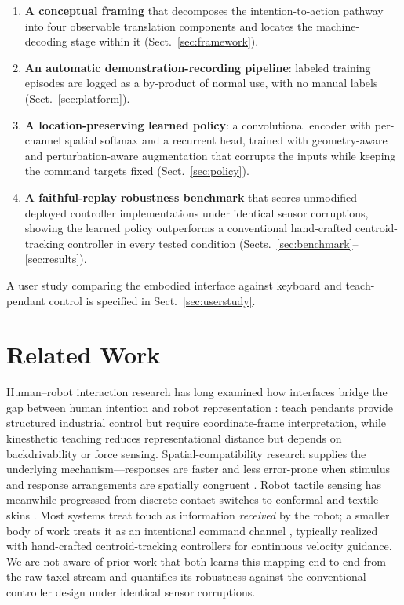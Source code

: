 \documentclass[runningheads]{llncs}
\begin{document}
\begin{enumerate}
  \item \textbf{A conceptual framing} that decomposes the
  intention-to-action pathway into four observable translation components
  and locates the machine-decoding stage within it
  (Sect.~\ref{sec:framework}).
  \item \textbf{An automatic demonstration-recording pipeline}: labeled
  training episodes are logged as a by-product of normal use, with no
  manual labels (Sect.~\ref{sec:platform}).
  \item \textbf{A location-preserving learned policy}: a convolutional
  encoder with per-channel spatial softmax and a recurrent head, trained
  with geometry-aware and perturbation-aware augmentation that corrupts
  the inputs while keeping the command targets fixed
  (Sect.~\ref{sec:policy}).
  \item \textbf{A faithful-replay robustness benchmark} that scores
  unmodified deployed controller implementations under identical sensor
  corruptions, showing the learned policy outperforms a conventional
  hand-crafted centroid-tracking controller in every tested condition
  (Sects.~\ref{sec:benchmark}--\ref{sec:results}).
\end{enumerate}

A user study comparing the embodied interface against keyboard and
teach-pendant control is specified in Sect.~\ref{sec:userstudy}.

\section{Related Work}
\label{sec:related}

Human--robot interaction research has long examined how interfaces
bridge the gap between human intention and robot representation
\cite{goodrich2007,billard2019}: teach pendants provide structured
industrial control but require coordinate-frame interpretation, while
kinesthetic teaching reduces representational distance but depends on
backdrivability or force sensing. Spatial-compatibility research
supplies the underlying mechanism---responses are faster and less
error-prone when stimulus and response arrangements are spatially
congruent \cite{fitts1953}. Robot tactile sensing has meanwhile
progressed from discrete contact switches to conformal and textile
skins \cite{dahiya2010,si2023,luo2021}. Most systems treat touch as
information \emph{received} by the robot; a smaller body of work treats
it as an intentional command channel \cite{argall2010}, typically
realized with hand-crafted centroid-tracking controllers for continuous
velocity guidance. We are not aware of prior work that both learns this
mapping end-to-end from the raw taxel stream and quantifies its
robustness against the conventional controller design under identical
sensor corruptions.
\end{document}
